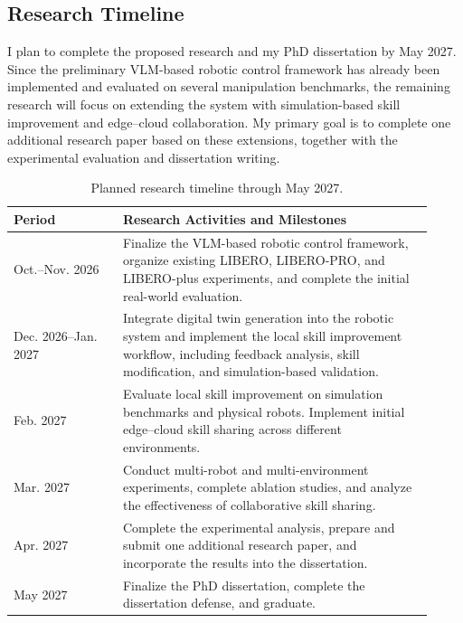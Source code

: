 \documentclass[11pt]{article}
\begin{document}
\subsection{Research Timeline}
\label{subsec:timeline}

I plan to complete the proposed research and my PhD dissertation by May 2027. Since the preliminary VLM-based robotic control framework has already been implemented and evaluated on several manipulation benchmarks, the remaining research will focus on extending the system with simulation-based skill improvement and edge--cloud collaboration. My primary goal is to complete one additional research paper based on these extensions, together with the experimental evaluation and dissertation writing.

\begin{table}[t]
    \centering
    \caption{Planned research timeline through May 2027.}
    \label{tab:research_timeline}
    \small
    \begin{tabular}{p{0.24\linewidth}p{0.68\linewidth}}
        \hline
        \textbf{Period} & \textbf{Research Activities and Milestones} \\
        \hline
        Oct.--Nov. 2026 & Finalize the VLM-based robotic control framework, organize existing LIBERO, LIBERO-PRO, and LIBERO-plus experiments, and complete the initial real-world evaluation. \\
        Dec. 2026--Jan. 2027 & Integrate digital twin generation into the robotic system and implement the local skill improvement workflow, including feedback analysis, skill modification, and simulation-based validation. \\
        Feb. 2027 & Evaluate local skill improvement on simulation benchmarks and physical robots. Implement initial edge--cloud skill sharing across different environments. \\
        Mar. 2027 & Conduct multi-robot and multi-environment experiments, complete ablation studies, and analyze the effectiveness of collaborative skill sharing. \\
        Apr. 2027 & Complete the experimental analysis, prepare and submit one additional research paper, and incorporate the results into the dissertation. \\
        May 2027 & Finalize the PhD dissertation, complete the dissertation defense, and graduate. \\
        \hline
    \end{tabular}
\end{table}
\end{document}
